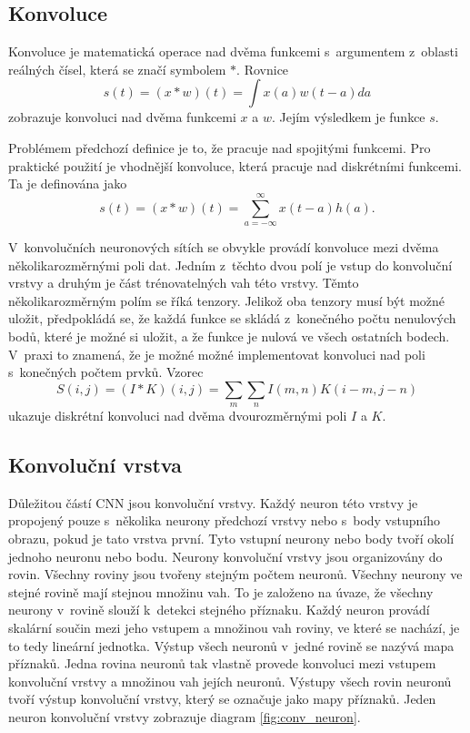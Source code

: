 \subsection{Konvoluce}
\label{sub:conv_definition}

Konvoluce je matematická operace nad dvěma funkcemi s~argumentem z~oblasti reálných čísel, která se značí symbolem $*$.
Rovnice \begin{equation}s(t)=(x*w)(t)=\int x(a)w(t-a)da\label{eq:convolution}\end{equation} zobrazuje konvoluci nad dvěma funkcemi $x$ a $w$.
Jejím výsledkem je funkce $s$.

Problémem předchozí definice je to, že pracuje nad spojitými funkcemi.
Pro praktické použití je vhodnější konvoluce, která pracuje nad diskrétními funkcemi.
Ta je definována jako \begin{equation}s(t)=(x*w)(t)=\sum_{a=-\infty}^{\infty}{x(t-a)h(a)}.\label{eq:discrete_convolution}\end{equation}

V~konvolučních neuronových sítích se obvykle provádí konvoluce mezi dvěma několikarozměrnými poli dat.
Jedním z~těchto dvou polí je vstup do konvoluční vrstvy a druhým je část trénovatelných vah této vrstvy.
Těmto několikarozměrným polím se říká tenzory.
Jelikož oba tenzory musí být možné uložit, předpokládá se, že každá funkce se skládá z~konečného počtu nenulových bodů, které je možné si uložit, a že funkce je nulová ve všech ostatních bodech. 
V~praxi to znamená, že je možné možné implementovat konvoluci nad poli s~konečných počtem prvků.
Vzorec \begin{equation}S(i,j)=(I*K)(i,j)=\sum_{m}\sum_{n}{I(m,n)K(i-m,j-n)}\label{eq:2D_discrete_convolution}\end{equation} ukazuje diskrétní konvoluci nad dvěma dvourozměrnými poli $I$ a $K$.

\subsection{Konvoluční vrstva}
\label{sub:conv_layer}

Důležitou částí CNN jsou konvoluční vrstvy.
Každý neuron této vrstvy je propojený pouze s~několika neurony předchozí vrstvy nebo s~body vstupního obrazu, pokud je tato vrstva první.
Tyto vstupní neurony nebo body tvoří okolí jednoho neuronu nebo bodu.
Neurony konvoluční vrstvy jsou organizovány do rovin.
Všechny roviny jsou tvořeny stejným počtem neuronů.
Všechny neurony ve stejné rovině mají stejnou množinu vah.
To je založeno na úvaze, že všechny neurony v~rovině slouží k~detekci stejného příznaku.
Každý neuron provádí skalární součin mezi jeho vstupem a množinou vah roviny, ve které se nachází, je to tedy lineární jednotka.
Výstup všech neuronů v~jedné rovině se nazývá mapa příznaků.
Jedna rovina neuronů tak vlastně provede konvoluci mezi vstupem konvoluční vrstvy a množinou vah jejích neuronů.
Výstupy všech rovin neuronů tvoří výstup konvoluční vrstvy, který se označuje jako mapy příznaků.
Jeden neuron konvoluční vrstvy zobrazuje diagram \ref{fig:conv_neuron}.

